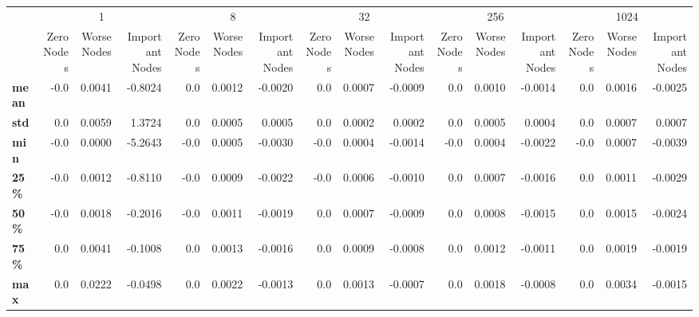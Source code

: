 \begin{tabular}{lrrrrrrrrrrrrrrr}
\toprule
{} & \multicolumn{3}{c}{1} & \multicolumn{3}{c}{8} & \multicolumn{3}{c}{32} & \multicolumn{3}{c}{256} & \multicolumn{3}{c}{1024} \\
{} & Zero Nodes & Worse Nodes & Important Nodes & Zero Nodes & Worse Nodes & Important Nodes & Zero Nodes & Worse Nodes & Important Nodes & Zero Nodes & Worse Nodes & Important Nodes & Zero Nodes & Worse Nodes & Important Nodes \\
\midrule
\textbf{mean} &       -0.0 &      0.0041 &         -0.8024 &        0.0 &      0.0012 &         -0.0020 &        0.0 &      0.0007 &         -0.0009 &        0.0 &      0.0010 &         -0.0014 &        0.0 &      0.0016 &         -0.0025 \\
\textbf{std } &        0.0 &      0.0059 &          1.3724 &        0.0 &      0.0005 &          0.0005 &        0.0 &      0.0002 &          0.0002 &        0.0 &      0.0005 &          0.0004 &        0.0 &      0.0007 &          0.0007 \\
\textbf{min } &       -0.0 &      0.0000 &         -5.2643 &       -0.0 &      0.0005 &         -0.0030 &       -0.0 &      0.0004 &         -0.0014 &       -0.0 &      0.0004 &         -0.0022 &       -0.0 &      0.0007 &         -0.0039 \\
\textbf{25\% } &       -0.0 &      0.0012 &         -0.8110 &       -0.0 &      0.0009 &         -0.0022 &       -0.0 &      0.0006 &         -0.0010 &        0.0 &      0.0007 &         -0.0016 &        0.0 &      0.0011 &         -0.0029 \\
\textbf{50\% } &       -0.0 &      0.0018 &         -0.2016 &       -0.0 &      0.0011 &         -0.0019 &        0.0 &      0.0007 &         -0.0009 &        0.0 &      0.0008 &         -0.0015 &        0.0 &      0.0015 &         -0.0024 \\
\textbf{75\% } &        0.0 &      0.0041 &         -0.1008 &        0.0 &      0.0013 &         -0.0016 &        0.0 &      0.0009 &         -0.0008 &        0.0 &      0.0012 &         -0.0011 &        0.0 &      0.0019 &         -0.0019 \\
\textbf{max } &        0.0 &      0.0222 &         -0.0498 &        0.0 &      0.0022 &         -0.0013 &        0.0 &      0.0013 &         -0.0007 &        0.0 &      0.0018 &         -0.0008 &        0.0 &      0.0034 &         -0.0015 \\
\bottomrule
\end{tabular}
